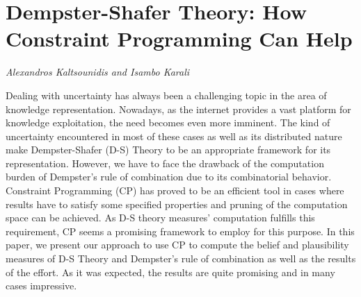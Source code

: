 \documentclass[../booklet.tex]{subfiles}
\begin{document}
\section[Dempster-Shafer Theory: How Constraint Programming Can Help. {\it Alexandros Kaltsounidis and Isambo Karali}]{Dempster-Shafer Theory: How Constraint Programming Can Help}
 

\begin{center}
  {\it Alexandros Kaltsounidis and Isambo Karali}
\end{center}

\vskip 0.8cm

Dealing with uncertainty has always been a challenging topic in the area of knowledge representation. Nowadays, as the internet provides a vast platform for knowledge exploitation, the need becomes even more imminent. The kind of uncertainty encountered in most of these cases as well as its distributed nature make Dempster-Shafer (D-S) Theory to be an appropriate framework for its representation. However, we have to face the drawback of the computation burden of Dempster's rule of combination due to its combinatorial behavior. Constraint Programming (CP) has proved to be an efficient tool in cases where results have to satisfy some specified properties and pruning of the computation space can be achieved. As D-S theory measures' computation fulfills this requirement, CP seems a promising framework to employ for this purpose. In this paper, we present our approach to use CP to compute the belief and plausibility measures of D-S Theory and Dempster's rule of combination as well as the results of the effort. As it was expected, the results are quite promising and in many cases impressive.

\end{document}
